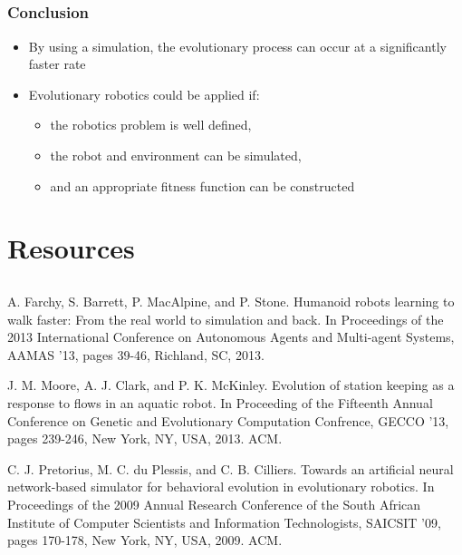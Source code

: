 \documentclass{beamer}
\begin{document}
\begin{frame}
\subsection{}
\begin{frame}
  \frametitle{Conclusion}
  \begin{itemize}
\item By using a simulation, the evolutionary process can occur at a significantly faster rate
\item Evolutionary robotics could be applied if:
 \begin{itemize}
\item the robotics problem is well defined,
\item the robot and environment can be simulated,
\item and an appropriate fitness function can be constructed
\end{itemize}
\end{itemize}
\end{frame}

\section*{Resources}
\subsection*{}
\begin{frame}
\begin{thebibliography}{lskdjf}
	
A. Farchy, S. Barrett, P. MacAlpine, and P. Stone.
\newblock Humanoid robots learning to walk faster: From the real world to simulation and back.
\newblock In Proceedings of the 2013 International Conference on Autonomous Agents and Multi-agent Systems, AAMAS '13, pages 39-46, Richland, SC, 2013.
	
	J. M. Moore, A. J. Clark, and P. K. McKinley.
\newblock Evolution of station keeping as a response to flows in an aquatic robot.
\newblock In Proceeding of the Fifteenth Annual Conference on Genetic and Evolutionary Computation Confrence, GECCO '13, pages 239-246, New York, NY, USA, 2013. ACM.
  
	C. J. Pretorius, M. C. du Plessis,  and C. B. Cilliers.
\newblock Towards an artificial neural network-based simulator for behavioral evolution in evolutionary robotics.
\newblock In Proceedings of the 2009 Annual Research Conference of the South African Institute of Computer Scientists and Information Technologists, SAICSIT '09, pages 170-178, New York, NY, USA, 2009. ACM.
  	\end{thebibliography}
\end{frame}


\end{frame}
\end{document}
